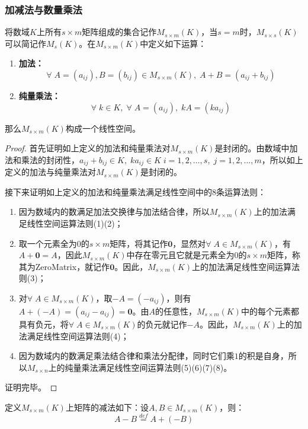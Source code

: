 \subsubsection{加减法与数量乘法}
\begin{definition}
	将数域$K$上所有$s\times m$矩阵组成的集合记作$M_{s\times m}(K)$，当$s=m$时，$M_{s\times s}(K)$可以简记作$M_s(K)$。在$M_{s\times m}(K)$中定义如下运算：
	\begin{enumerate}
		\item \textbf{加法：} 
		\begin{equation*}
			\forall\;A=(a_{ij}),B=(b_{ij})\in M_{s\times m}(K),\;A+B=(a_{ij}+b_{ij})
		\end{equation*}
		\item \textbf{纯量乘法：}
		\begin{equation*}
			\forall\;k\in K,\;\forall\;A=(a_{ij}),\;kA=(ka_{ij})
		\end{equation*}
	\end{enumerate}
	那么$M_{s\times m}(K)$构成一个线性空间。
\end{definition}
\begin{proof}
	首先证明如上定义的加法和纯量乘法对$M_{s\times m}(K)$是封闭的。由数域中加法和乘法的封闭性，$a_{ij}+b_{ij}\in K,\;ka_{ij}\in K\;i=1,2,\dots,s,\;j=1,2,\dots,m$，所以如上定义的加法与纯量乘法对$M_{s\times m}(K)$是封闭的。\par
	接下来证明如上定义的加法和纯量乘法满足线性空间中的8条运算法则：
	\begin{enumerate}
		\item 因为数域内的数满足加法交换律与加法结合律，所以$M_{s\times m}(K)$上的加法满足线性空间运算法则(1)(2)；
		\item 取一个元素全为$0$的$s\times m$矩阵，将其记作$\mathbf{0}$，显然对$\forall\;A\in M_{s\times m}(K)$，有$A+\mathbf{0}=A$，因此$M_{s\times m}(K)$中存在零元且它就是元素全为$0$的$s\times m$矩阵，称其为\gls{ZeroMatrix}，就记作$\mathbf{0}$。因此，$M_{s\times m}(K)$上的加法满足线性空间运算法则(3)；
		\item 对$\forall\;A\in M_{s\times m}(K)$，取$-A=(-a_{ij})$，则有$A+(-A)=(a_{ij}-a_{ij})=\mathbf{0}$。由$A$的任意性，$M_{s\times m}(K)$中的每个元素都具有负元，将$\forall\;A\in M_{s\times m}(K)$的负元就记作$-A$。因此，$M_{s\times m}(K)$上的加法满足线性空间运算法则(4)；
		\item 因为数域内的数满足乘法结合律和乘法分配律，同时它们乘$1$的积是自身，所以$M_{s\times n}$上的纯量乘法满足线性空间运算法则(5)(6)(7)(8)。
	\end{enumerate}
	证明完毕。
\end{proof}
\begin{definition}
	定义$M_{s\times m}(K)$上矩阵的减法如下：设$A,B\in M_{s\times m}(K)$，则：
	\begin{equation*}
		A-B\overset{def}{=}A+(-B)
	\end{equation*}
\end{definition}
